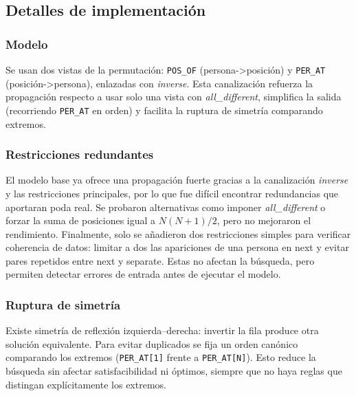 
\subsection{Detalles de implementación}\label{sec:05-reunion-impl}

\subsubsection*{Modelo}
Se usan dos vistas de la permutación: \texttt{POS\_OF} (persona->posición) y \texttt{PER\_AT} (posición->persona), enlazadas con \textit{inverse}. Esta canalización refuerza la propagación respecto a usar solo una vista con \textit{all\_different}, simplifica la salida (recorriendo \texttt{PER\_AT} en orden) y facilita la ruptura de simetría comparando extremos.

\subsubsection*{Restricciones redundantes}
El modelo base ya ofrece una propagación fuerte gracias a la canalización \textit{inverse} y las restricciones principales, por lo que fue difícil encontrar redundancias que aportaran poda real. Se probaron alternativas como imponer \textit{all\_different} o forzar la suma de posiciones igual a \(N(N+1)/2\), pero no mejoraron el rendimiento. Finalmente, solo se añadieron dos restricciones simples para verificar coherencia de datos: limitar a dos las apariciones de una persona en \textsf{next} y evitar pares repetidos entre \textsf{next} y \textsf{separate}. Estas no afectan la búsqueda, pero permiten detectar errores de entrada antes de ejecutar el modelo.

\subsubsection*{Ruptura de simetría}
Existe simetría de reflexión izquierda–derecha: invertir la fila produce otra solución equivalente. Para evitar duplicados se fija un orden canónico comparando los extremos (\texttt{PER\_AT[1]} frente a \texttt{PER\_AT[N]}). Esto reduce la búsqueda sin afectar satisfacibilidad ni óptimos, siempre que no haya reglas que distingan explícitamente los extremos.
